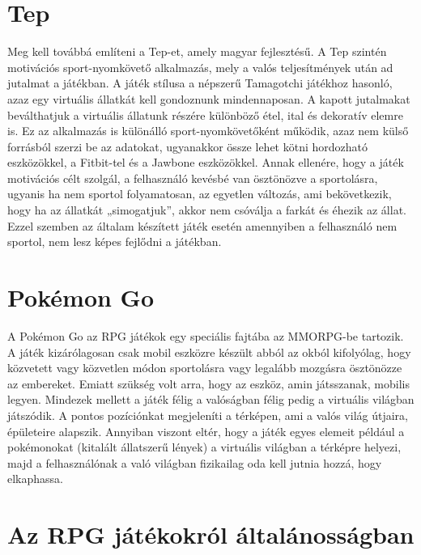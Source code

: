 \section*{Tep}
\label{resz2_2_2}

Meg kell továbbá említeni a Tep-et, amely magyar fejlesztésű. A Tep szintén motivációs sport-nyomkövető alkalmazás, mely a valós teljesítmények után ad jutalmat a játékban. A játék stílusa a népszerű Tamagotchi játékhoz hasonló, azaz egy virtuális állatkát kell gondoznunk mindennaposan. A kapott jutalmakat beválthatjuk a virtuális állatunk részére különböző étel, ital és dekoratív elemre is. Ez az alkalmazás is különálló sport-nyomkövetőként működik, azaz nem külső forrásból szerzi be az adatokat, ugyanakkor össze lehet kötni hordozható eszközökkel, a Fitbit-tel és a Jawbone eszközökkel. Annak ellenére, hogy a játék motivációs célt szolgál, a felhasználó kevésbé van ösztönözve a sportolásra, ugyanis ha nem sportol folyamatosan, az egyetlen változás, ami bekövetkezik, hogy ha az állatkát „simogatjuk”, akkor nem csóválja a farkát és éhezik az állat. Ezzel szemben az általam készített játék esetén amennyiben a felhasználó nem sportol, nem lesz képes fejlődni a játékban.

\section*{Pokémon Go}
\label{resz2_2_3}

A Pokémon Go az RPG játékok egy speciális fajtába az MMORPG-be tartozik. A játék kizárólagosan csak mobil eszközre készült abból az okból kifolyólag, hogy közvetett vagy közvetlen módon sportolásra vagy legalább mozgásra ösztönözze az embereket. Emiatt szükség volt arra, hogy az eszköz, amin játsszanak, mobilis legyen. Mindezek mellett a játék félig a valóságban félig pedig a virtuális világban játszódik. A pontos pozíciónkat megjeleníti a térképen, ami a valós világ útjaira, épületeire alapszik. Annyiban viszont eltér, hogy a játék egyes elemeit például a pokémonokat (kitalált állatszerű lények) a virtuális világban a térképre helyezi, majd a felhasználónak a való világban fizikailag oda kell jutnia hozzá, hogy elkaphassa.

\section{Az RPG játékokról általánosságban}
\label{resz2_3}

